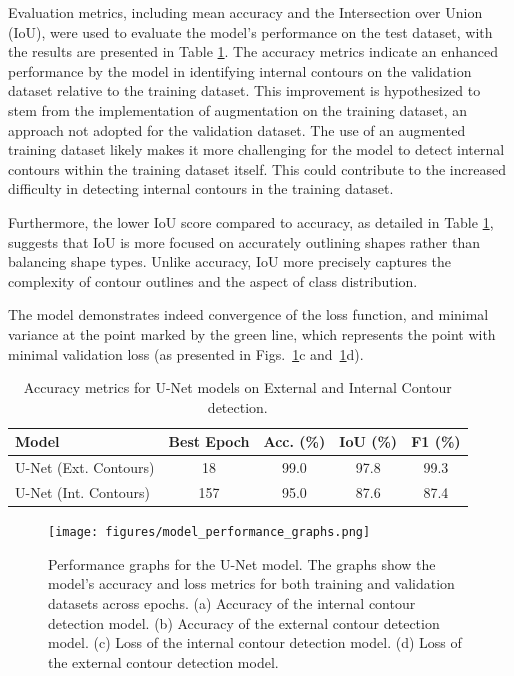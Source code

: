 \documentclass[preprint,12pt]{elsarticle}
\begin{document}
Evaluation metrics, including mean accuracy and the Intersection over Union (IoU), were used to evaluate the model's performance on the test dataset, with the results are presented in Table \ref{tab:unet_performance}. The accuracy metrics indicate an enhanced performance by the model in identifying internal contours on the validation dataset relative to the training dataset. This improvement is hypothesized to stem from the implementation of augmentation on the training dataset, an approach not adopted for the validation dataset. The use of an augmented training dataset likely makes it more challenging for the model to detect internal contours within the training dataset itself. This could contribute to the increased difficulty in detecting internal contours in the training dataset.

Furthermore, the lower IoU score compared to accuracy, as detailed in Table \ref{tab:unet_performance}, suggests that IoU is more focused on accurately outlining shapes rather than balancing shape types. Unlike accuracy, IoU more precisely captures the complexity of contour outlines and the aspect of class distribution.

The model demonstrates indeed convergence of the loss function, and minimal variance at the point marked by the green line, which represents the point with minimal validation loss (as presented in Figs.~\ref{fig:model_performance_graphs}c and~\ref{fig:model_performance_graphs}d).

\begin{table}[ht]
\centering
\begin{tabular}{lcccc}
\hline
Model & Best Epoch & Acc. (\%) & IoU (\%) & F1 (\%)\\ \hline
U-Net (Ext. Contours) & 18 & 99.0 & 97.8 & 99.3 \\
U-Net (Int. Contours) & 157 & 95.0 & 87.6 & 87.4 \\ \hline
\end{tabular}
\caption{Accuracy metrics for U-Net models on External and Internal Contour detection.}
\label{tab:unet_performance}
\end{table}



\begin{figure}[h]
    \centering
    \begin{adjustbox}{max width=0.8\linewidth, max height=0.8\textheight}
        \texttt{[image: figures/model\_performance\_graphs.png]}
    \end{adjustbox}
    \caption{Performance graphs for the U-Net model. The graphs show the model's accuracy and loss metrics for both training and validation datasets across epochs. (a) Accuracy of the internal contour detection model. (b) Accuracy of the external contour detection model. (c) Loss of the internal contour detection model. (d) Loss of the external contour detection model.}
    \label{fig:model_performance_graphs}
\end{figure}
\end{document}
